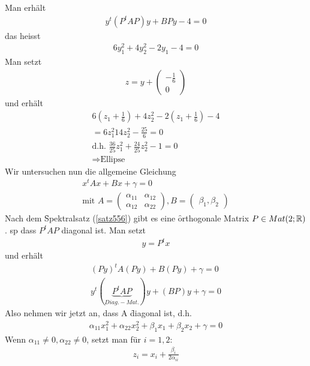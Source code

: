 Man erhält
\begin{align}
y^t(P^t A P)y + B Py - 4 = 0
\end{align}
das heisst
\begin{align}
6y_{1}^{2} + 4 y_{2}^{2} - 2 y_{1} - 4 = 0
\end{align}
Man setzt
\begin{align}
z = y + \begin{pmatrix} -\frac{1}{6} \\ 0 \end{pmatrix}
\end{align}
und erhält
\begin{align}
6(z_1 + \frac{1}{6}) + 4z_{2}^{2} - 2(z_{1} + \frac{1}{6}) -4 \\
= 6z_{1}^{2} 1 4z_{2}^{2} - \frac{25}{6} = 0 \\
\text{d.h. } \frac{36}{25} z_{1}^{2} + \frac{24}{25} z_{2}^{2} -1 = 0 \\
\Rightarrow \text{Ellipse}
\end{align}
Wir untersuchen nun die allgemeine Gleichung
\begin{align}
x^t Ax + Bx + \gamma = 0 \\
\text{mit } A = \begin{pmatrix} \alpha_{11} & \alpha_{12} \\ \alpha_{12} & \alpha_{22} \end{pmatrix}, B = \begin{pmatrix} \beta_1, \beta_2 \end{pmatrix}
\end{align}
Nach dem \f{Spektralsatz} (\ref{satz556}) gibt es eine \f{orthogonale} Matrix $P \in Mat(2; \mathbb{R})$. sp dass $P^t A P$ diagonal ist. Man setzt
\begin{align}
y = P^t x
\end{align}
und erhält
\begin{align}
(Py)^t A (Py) + B(Py) + \gamma = 0 \\
y^t (\underbrace{P^t A P}_{Diag.-Mat.}) y + (BP)y + \gamma = 0
\end{align}
Also nehmen wir jetzt an, dass A \f{diagonal} ist, d.h.
\begin{align}
\alpha_{11} x_{1}^{2} + \alpha_{22} x_{2}^{2} + \beta_1 x_1 + \beta_2 x_2 + \gamma = 0
\end{align}
Wenn $\alpha_{11} \neq 0, \alpha_{22} \neq 0$, setzt man für $i = 1, 2:$
\begin{align}
z_i = x_i + \frac{\beta_i}{2 \alpha_{ii}}
\end{align}
